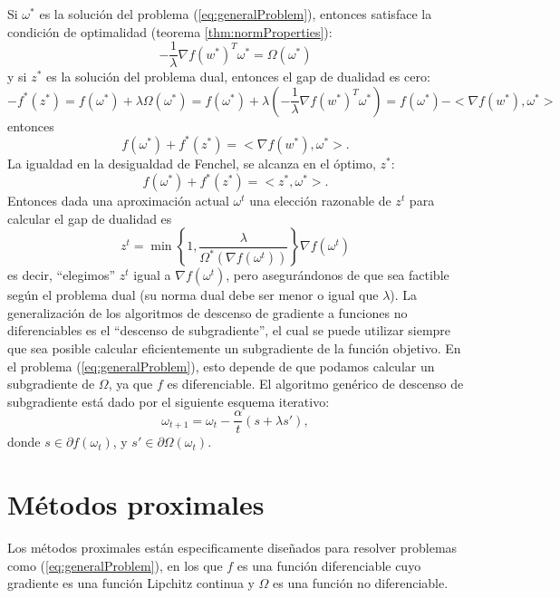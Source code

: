 \documentclass[12pt,draftcls, onecolumn, letterpaper,compsoc]{IEEEtran}
\begin{document}
Si $\omega^{*}$ es la soluci\'{o}n del problema (\ref{eq:generalProblem}), entonces satisface la condici\'{o}n de optimalidad (teorema \ref{thm:normProperties}):
\begin{displaymath}
    -\frac{1}{\lambda}\nabla f(w^{*})^T \omega^{*} = \Omega(\omega^{*})
\end{displaymath}
y si $z^{*}$ es la soluci\'{o}n del problema dual, entonces el gap de dualidad es cero:
\begin{displaymath}
    -f^{*}(z^{*}) = f(\omega^{*}) + \lambda \Omega(\omega^{*}) = f(\omega^{*}) + \lambda (-\frac{1}{\lambda}\nabla f(w^{*})^T \omega^{*}) = f(\omega^{*}) - <\nabla f(w^{*}), \omega^{*}>
\end{displaymath}
entonces
\begin{displaymath}
    f(\omega^{*})+f^{*}(z^{*}) = <\nabla f(w^{*}), \omega^{*}>.
\end{displaymath}
La igualdad en la desigualdad de Fenchel, se alcanza en el \'{o}ptimo, $z^{*}$:
\begin{displaymath}
    f(\omega^{*})+f^{*}(z^{*}) = <z^{*}, \omega^{*}>.
\end{displaymath}
Entonces dada una aproximaci\'{o}n actual $\omega^{t}$ una elecci\'{o}n razonable de $z^{t}$ para calcular el gap de dualidad es
\begin{displaymath}
    z^{t} = \min\left\lbrace 1, \frac{\lambda}{\Omega^{*}(\nabla f(\omega^{t}))}\right\rbrace \nabla f(\omega^{t})
\end{displaymath}
es decir, ``elegimos'' $z^{t}$ igual a  $\nabla f(\omega^{t})$, pero asegur\'{a}ndonos de que sea factible seg\'{u}n el problema dual (su norma dual debe ser menor o igual que $\lambda$). La generalizaci\'{o}n de los algoritmos de descenso de gradiente a funciones no diferenciables es el ``descenso de subgradiente'', el cual se puede utilizar siempre que sea posible calcular eficientemente un subgradiente de la funci\'{o}n objetivo. En el problema (\ref{eq:generalProblem}), esto depende de que podamos calcular un subgradiente de $\Omega$, ya que $f$ es diferenciable. El algoritmo gen\'{e}rico de descenso de subgradiente est\'{a} dado por el siguiente esquema iterativo:
\begin{equation}\label{eq:subgradient_descent}
    \omega_{t+1} = \omega_{t} - \frac{\alpha}{t}(s + \lambda s'),
\end{equation}
donde $s\in \partial f(\omega_t)$, y $s'\in \partial \Omega(\omega_t)$.

\section{M\'{etodos proximales}}
Los m\'{e}todos proximales est\'{a}n especificamente dise\~{n}ados para resolver problemas como (\ref{eq:generalProblem}), en los que $f$ es una funci\'{o}n diferenciable cuyo gradiente es una funci\'{o}n Lipchitz continua y $\Omega$ es una funci\'{o}n no diferenciable.\\
\end{document}
